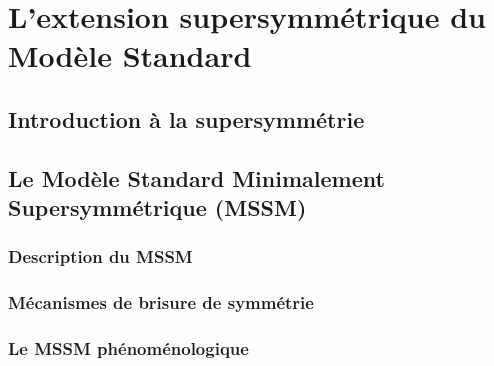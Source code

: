 \singlespacing{}
\chapter{L'extension supersymmétrique du Modèle Standard}
\label{sec:susy}
\doublespacing{}

\section{Introduction à la supersymmétrie}
\label{sec:susy:th}

\section{Le Modèle Standard Minimalement Supersymmétrique (MSSM)}
\label{sec:susy:mssm}

\subsection{Description du MSSM}
\label{sec:susy:mssm:descr}

\subsection{Mécanismes de brisure de symmétrie}
\label{sec:susy:mssm:break}

\subsection{Le MSSM phénoménologique}
\label{sec:susy:mssm:pmssm}


